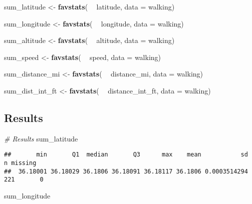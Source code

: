 \documentclass[
]{article}
\newenvironment{Shaded}{\begin{snugshade}}{\end{snugshade}}
\newcommand{\CommentTok}[1]{\textcolor[rgb]{0.56,0.35,0.01}{\textit{#1}}}
\newcommand{\DataTypeTok}[1]{\textcolor[rgb]{0.13,0.29,0.53}{#1}}
\newcommand{\KeywordTok}[1]{\textcolor[rgb]{0.13,0.29,0.53}{\textbf{#1}}}
\newcommand{\NormalTok}[1]{#1}
\newcommand{\OperatorTok}[1]{\textcolor[rgb]{0.81,0.36,0.00}{\textbf{#1}}}
\newcommand{\StringTok}[1]{\textcolor[rgb]{0.31,0.60,0.02}{#1}}
\begin{document}
\begin{Shaded}
\begin{Highlighting}[]
\NormalTok{sum_latitude <-}\StringTok{ }\KeywordTok{favstats}\NormalTok{( }\OperatorTok{~}\StringTok{ }\NormalTok{latitude, }\DataTypeTok{data =}\NormalTok{ walking)}

\NormalTok{sum_longitude <-}\StringTok{ }\KeywordTok{favstats}\NormalTok{( }\OperatorTok{~}\StringTok{ }\NormalTok{longitude, }\DataTypeTok{data =}\NormalTok{ walking)}

\NormalTok{sum_altitude <-}\StringTok{ }\KeywordTok{favstats}\NormalTok{( }\OperatorTok{~}\StringTok{ }\NormalTok{altitude, }\DataTypeTok{data =}\NormalTok{ walking)}

\NormalTok{sum_speed <-}\StringTok{ }\KeywordTok{favstats}\NormalTok{( }\OperatorTok{~}\StringTok{ }\NormalTok{speed, }\DataTypeTok{data =}\NormalTok{ walking)}

\NormalTok{sum_distance_mi <-}\StringTok{ }\KeywordTok{favstats}\NormalTok{( }\OperatorTok{~}\StringTok{ }\NormalTok{distance_mi, }\DataTypeTok{data =}\NormalTok{ walking)}

\NormalTok{sum_dist_int_ft <-}\StringTok{ }\KeywordTok{favstats}\NormalTok{( }\OperatorTok{~}\StringTok{ }\NormalTok{distance_int_ft, }\DataTypeTok{data =}\NormalTok{ walking)}
\end{Highlighting}
\end{Shaded}

\hypertarget{results}{%
\subsection{Results}\label{results}}

\begin{Shaded}
\begin{Highlighting}[]
\CommentTok{# Results}
\NormalTok{sum_latitude}
\end{Highlighting}
\end{Shaded}

\begin{verbatim}
##       min       Q1  median       Q3      max    mean           sd   n missing
##  36.18001 36.18029 36.1806 36.18091 36.18117 36.1806 0.0003514294 221       0
\end{verbatim}

\begin{Shaded}
\begin{Highlighting}[]
\NormalTok{sum_longitude}
\end{Highlighting}
\end{Shaded}
\end{document}
